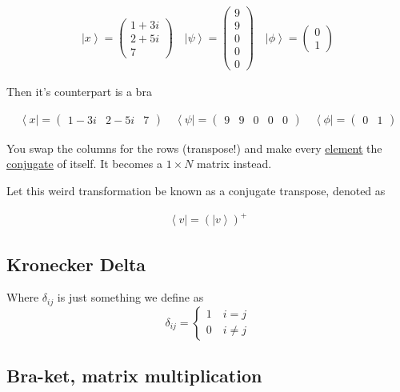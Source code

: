 \documentclass[
]{article}
\let\oldhyperref\hyperref
\renewcommand{\hyperref}[2][]{\oldhyperref[#1]{\underline{#2}}}
\providecommand{\ket}[1]{\left\lvert #1 \right\rangle}
\providecommand{\bra}[1]{\left\langle #1 \right\rvert}
\begin{document}
\begin{gather*}
	\ket{x}=\begin{pmatrix}
		1+3i \\
		2+5i \\
		7
	\end{pmatrix}\quad \ket{\psi}=\begin{pmatrix}
		9 \\
		9 \\
		0 \\
		0 \\
		0
	\end{pmatrix}\quad\ket{\phi}=\begin{pmatrix}
		0 \\
		1
	\end{pmatrix}
\end{gather*}

Then it's counterpart is a bra

\begin{gather*}
	\bra{x}=\begin{pmatrix}
		1-3i &
		2-5i &
		7
	\end{pmatrix}\quad \bra{\psi}=\begin{pmatrix}
		9 &
		9 &
		0 &
		0 &
		0
	\end{pmatrix}\quad\bra{\phi}=\begin{pmatrix}
		0 &
		1
	\end{pmatrix}
\end{gather*}

You swap the columns for the rows (transpose!) and make every \hyperref[element]{element}
the \hyperref[conjugate]{conjugate} of itself. It becomes a \(1\times N\) matrix instead.

Let this weird transformation be known as a conjugate transpose, denoted
as

\begin{gather*}
	\bra{v}=(\ket{v})^+
\end{gather*}


\subsection{Kronecker Delta}\label{kronecker-delta}

Where \(\delta_{ij}\) is just something we define as
\[\delta_{ij}=\begin{cases}1\quad i=j\\0\quad i\neq j\end{cases}\]

\subsection{Bra-ket, matrix
	multiplication}\label{bra-ket-matrix-multiplication}
\end{document}
